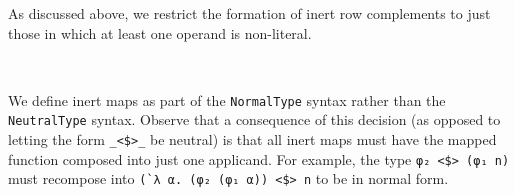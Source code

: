 \documentclass[authoryear, acmsmall, screen, review, nonacm]{acmart}
\begin{document}
As discussed above, we restrict the formation of inert row complements to just those in which at least one operand is non-literal.

\begin{code}%
%
\>[2]\AgdaSpace{}%
\AgdaSymbol{:}%
\>[2810I]\AgdaSymbol{(}\AgdaSpace{}%
\AgdaSpace{}%
\AgdaSymbol{:}\AgdaSpace{}%
\AgdaSpace{}%
\AgdaSpace{}%
\AgdaOperator{\AgdaInductiveConstructor{R[}}\AgdaSpace{}%
\AgdaSpace{}%
\AgdaOperator{\AgdaInductiveConstructor{]}}\AgdaSymbol{)}\AgdaSpace{}%
\AgdaSpace{}%
\AgdaSymbol{\{}\AgdaSpace{}%
\AgdaSymbol{:}\AgdaSpace{}%
\AgdaSpace{}%
\AgdaSymbol{(}\AgdaSpace{}%
\AgdaSpace{}%
\AgdaSymbol{)\}}\AgdaSpace{}%
\<%
\\
\>[.][@{}l@{}]\<[2810I]%
\>[8]\AgdaSpace{}%
\AgdaSpace{}%
\AgdaOperator{\AgdaInductiveConstructor{R[}}\AgdaSpace{}%
\AgdaSpace{}%
\AgdaOperator{\AgdaInductiveConstructor{]}}\<%
\end{code}

We define inert maps as part of the \verb!NormalType! syntax rather than the \verb!NeutralType! syntax. Observe that a consequence of this decision (as opposed to letting the form \verb!_<$>_! be neutral) is that all inert maps must have the mapped function composed into just one applicand. For example, the type \verb!φ₂ <$> (φ₁ n)! must recompose into \verb!(`λ α. (φ₂ (φ₁ α)) <$> n! to be in normal form.
 
\begin{code}%
%
\>[2]\AgdaOperator{\AgdaInductiveConstructor{\AgdaUnderscore{}<\$>\AgdaUnderscore{}}}\AgdaSpace{}%
\AgdaSymbol{:}\AgdaSpace{}%
\AgdaSymbol{(}\AgdaSpace{}%
\AgdaSymbol{:}\AgdaSpace{}%
\AgdaSpace{}%
\AgdaSpace{}%
\AgdaSymbol{(}\AgdaSpace{}%
\AgdaSpace{}%
\AgdaSymbol{))}\AgdaSpace{}%
\AgdaSpace{}%
\AgdaSpace{}%
\AgdaSpace{}%
\AgdaOperator{\AgdaInductiveConstructor{R[}}\AgdaSpace{}%
\AgdaSpace{}%
\AgdaOperator{\AgdaInductiveConstructor{]}}\AgdaSpace{}%
\AgdaSpace{}%
\AgdaSpace{}%
\AgdaSpace{}%
\AgdaOperator{\AgdaInductiveConstructor{R[}}\AgdaSpace{}%
\AgdaSpace{}%
\AgdaOperator{\AgdaInductiveConstructor{]}}\<%
\end{code}
\end{document}
